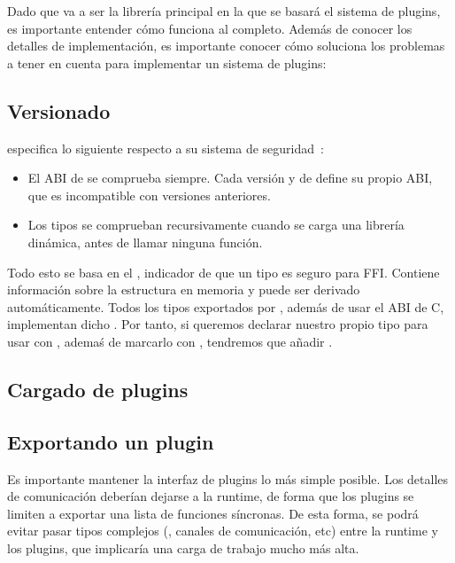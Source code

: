 Dado que \abistable va a ser la librería principal en la que se basará el
sistema de plugins, es importante entender cómo funciona al completo. Además de
conocer los detalles de implementación, es importante conocer cómo \abistable
soluciona los problemas a tener en cuenta para implementar un sistema de
plugins:

\subsection{Versionado}

\abistable especifica lo siguiente respecto a su sistema de
seguridad~\cite{abistable_safety}:

\begin{itemize}
    \item El ABI de \abistable se comprueba siempre. Cada versión  y
         de \abistable define su propio ABI, que es incompatible
        con versiones anteriores.

    \item Los tipos se comprueban recursivamente cuando se carga una librería
        dinámica, antes de llamar ninguna función.

\end{itemize}

Todo esto se basa en el \trait {}, indicador de que un tipo es
seguro para FFI. Contiene información sobre la estructura en memoria y puede ser
derivado automáticamente. Todos los tipos exportados por \abistable, además de
usar el ABI de C, implementan dicho \trait. Por tanto, si queremos declarar
nuestro propio tipo para usar con \abistable, ademaś de marcarlo con
\rust{#[repr(C)]}, tendremos que añadir .

\subsection{Cargado de plugins}

\subsection{Exportando un plugin}

Es importante mantener la interfaz de plugins lo más simple posible. Los
detalles de comunicación deberían dejarse a la runtime, de forma que los plugins
se limiten a exportar una lista de funciones síncronas. De esta forma, se podrá
evitar pasar tipos complejos (, canales de comunicación, etc) entre
la runtime y los plugins, que implicaría una carga de trabajo mucho más alta.

